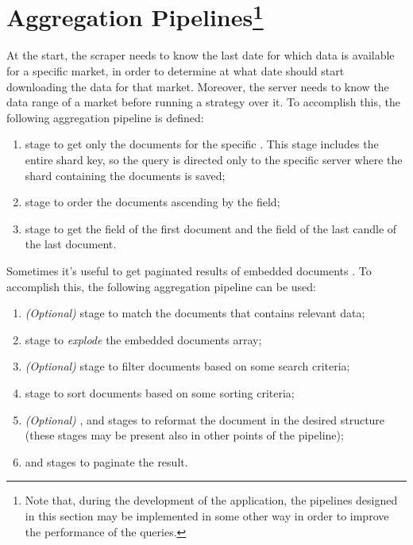 \section[Aggregation Pipelines]{Aggregation Pipelines\footnote{Note that, during
the development of the application, the pipelines designed in this section may
be implemented in some other way  in order to improve the performance of the
queries.}}\label{sec:aggregations}

At the start, the scraper needs to know the last date for which data is
available for a specific market, in order to determine at what date should start
downloading the data for that market. Moreover, the server needs to know the
data range of a market before running a strategy over it. To accomplish this,
the following aggregation pipeline is defined:
\begin{enumerate}
	\item {} stage to get only the documents for the specific
		. This stage includes the entire shard key, so the
		query is directed only to the specific server where the shard
		containing the documents is saved;
	\item {} stage to order the documents ascending by the
		 field;
	\item {} stage to get the  field of the first
		document and the  field of the last candle of
		the last document.
\end{enumerate}

Sometimes it's useful to get paginated results of embedded documents
.
To accomplish this, the following aggregation pipeline can be used:
\begin{enumerate}
	\item \textit{(Optional)}  stage to match the documents
		that contains relevant data;
	\item {} stage to \emph{explode} the embedded documents
		array;
	\item \textit{(Optional)}  stage to filter documents based
		on some search criteria;
	\item {} stage to sort documents based on some sorting
		criteria;
	\item \textit{(Optional)} ,  and
		 stages to reformat the document in the
		desired structure (these stages may be present also in other
		points of the pipeline);
	\item {} and  stages to paginate the result.
\end{enumerate}

